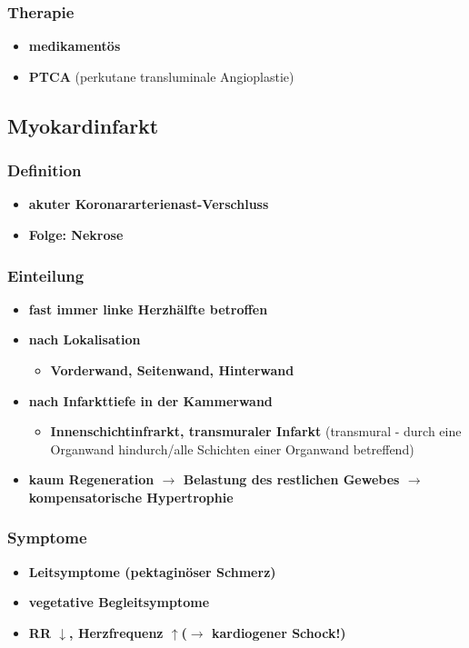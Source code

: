 	\subsubsection{Therapie}
		\begin{itemize}
			\item \textbf{medikamentös}
			\item \textbf{PTCA} (perkutane transluminale Angioplastie)
		\end{itemize}
\subsection{Myokardinfarkt}
	\subsubsection{Definition}
		\begin{itemize}
			\item \textbf{akuter Koronararterienast-Verschluss}
			\item \textbf{Folge: Nekrose}
		\end{itemize}
	\subsubsection{Einteilung}
		\begin{itemize}
			\item \textbf{fast immer linke Herzhälfte betroffen}
			\item \textbf{nach Lokalisation}
				\begin{itemize}
					\item \textbf{Vorderwand, Seitenwand, Hinterwand}
				\end{itemize}
			\item \textbf{nach Infarkttiefe in der Kammerwand}
				\begin{itemize}
					\item \textbf{Innenschichtinfrarkt, transmuraler Infarkt} (transmural - durch eine Organwand hindurch/alle Schichten einer Organwand betreffend)
				\end{itemize}
			\item \textbf{kaum Regeneration $\rightarrow$ Belastung des restlichen Gewebes $\rightarrow$ kompensatorische Hypertrophie}
		\end{itemize}
	\subsubsection{Symptome}
		\begin{itemize}
			\item \textbf{Leitsymptome (pektaginöser Schmerz)}
			\item \textbf{vegetative Begleitsymptome}
			\item \textbf{RR $\downarrow$, Herzfrequenz $\uparrow$($\rightarrow$ kardiogener Schock!)}
		\end{itemize}
